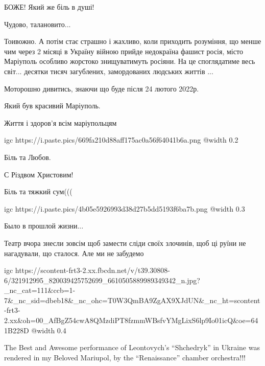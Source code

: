 БОЖЕ! Який же біль в душі!


Чудово, талановито...

Тоивожно. А потім стає страшно і жахливо, коли приходить розуміння, що менше
чим через 2 місяці в Україну війною прийде недокраїна фашист росія, місто
Маріуполь особливо жорстоко знищуватимуть росіяни. На це споглядатиме весь
світ... десятки тисяч загублених, замордованих людських життів ...

Моторошно дивитись, знаючи що буде після 24 лютого 2022р.


Який був красивий Маріуполь.

Життя і здоров'я всім маріупольцям


\ifcmt
  igc https://i.paste.pics/669fa210d88aff175ac0a56f64041b6a.png
	@width 0.2
\fi


Біль та Любов.


С Різдвом Христовим!


Біль та тяжкий сум(((


\ifcmt
  igc https://i.paste.pics/4b05e5926993d38d27b5dd5193f6ba7b.png
	@width 0.3
\fi


Было в прошлой жизни...


Театр вчора знесли зовсім щоб замести сліди своїх злочинів, щоб ці руїни не нагадували, що сталося. Але ми не забудемо


\ifcmt
  igc https://scontent-frt3-2.xx.fbcdn.net/v/t39.30808-6/321912995_820039425752699_6610505889989349342_n.jpg?_nc_cat=111&ccb=1-7&_nc_sid=dbeb18&_nc_ohc=T0W3QmBA9ZgAX9XJdUN&_nc_ht=scontent-frt3-2.xx&oh=00_AfBgZ54cwA8QMzdiPT8fzmmWBsfvYMgLixS6lp9Io01icQ&oe=641B228D
	@width 0.4
\fi


The Best and Awesome performance of Leontovych's \enquote{Shchedryk} in Ukraine was
rendered in my Beloved Mariupol, by the \enquote{Renaissance} chamber orchestra!!!


